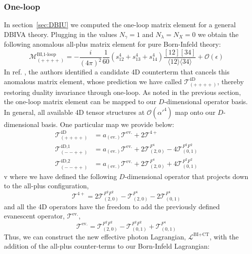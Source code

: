 \documentclass[11pt,letter]{article}
\def\sect#1{section~\ref{#1}}
\begin{document}
\subsubsection{One-loop}\label{sec:Anomalies1loop}
In \sect{sec:DBIU} we computed the one-loop matrix element for a general DBIVA theory. Plugging in the values $N_{\gamma}=1$ and $N_\lambda = N_X = 0$ we obtain the following anomalous all-plus matrix element for pure Born-Infeld theory:
\begin{equation}
\mathcal{M}^{\text{BI,1-loop}}_{(++++)} = -\frac{i}{(4\pi)^2}\frac{1}{60}(s_{12}^4+s_{13}^4+s_{14}^4)\frac{[12][34]}{\langle12\rangle\langle 34\rangle}+\mathcal{O}(\epsilon)
\end{equation}
In ref. \cite{Elvang:2020kuj}, the authors identified a candidate 4D counterterm that cancels this anomalous matrix element, whose prediction we have called $\mathcal{T}^{\text{4D}}_{(++++)}$, thereby restoring duality invariance through one-loop. As noted in the previous section, the one-loop matrix element can be mapped to our $D$-dimensional operator basis. In general, all available 4D tensor structures at $\mathcal{O}(\alpha'^4)$ map onto our $D$-dimensional basis. One particular map we provide below:
\begin{align}
\mathcal{T}^{\text{4D}}_{(++++)} &=  a_{({\text{ev.}})}\mathcal{T}^{\text{ev.}}+2\mathcal{T}^{4+}
\\
\mathcal{T}^{\text{4D,1}}_{(--++)} &= a_{({\text{ev.}})}\mathcal{T}^{\text{ev.}}+2\mathcal{T}_{(2,0)}^{F^4}- 4\mathcal{T}_{(0,1)}^{F^2F^2}
\\ 
\mathcal{T}^{4\text{D,}2}_{(--++)} &= a_{({\text{ev.}})}\mathcal{T}^{\text{ev.}}+2\mathcal{T}_{(2,0)}^{F^4}+ 4\mathcal{T}_{(0,1)}^{F^2F^2}
\end{align}v
where we have defined the following $D$-dimensional operator that projects down to the all-plus configuration,
\begin{equation}
\mathcal{T}^{4+}= 2 \mathcal{T}_{(2,0)}^{F^2F^2}-\mathcal{T}_{(2,0)}^{F^4}-2\mathcal{T}_{(0,1)}^{F^4}
\end{equation}
and all the 4D operators have the freedom to add the previously defined evanescent operator, $\mathcal{T}^{\text{ev.}}$, 
\begin{equation}
\mathcal{T}^{\text{ev.}} = \mathcal{T}_{(2,0)}^{F^2F^2}-\mathcal{T}_{(0,1)}^{F^2F^2} + \mathcal{T}_{(0,1)}^{F^4}
\end{equation}
Thus, we can construct the new effective photon Lagrangian, $\mathcal{L}^{\text{BI}+\text{CT}}$, with the addition of the all-plus counter-terms to our Born-Infeld Lagrangian:
\end{document}
